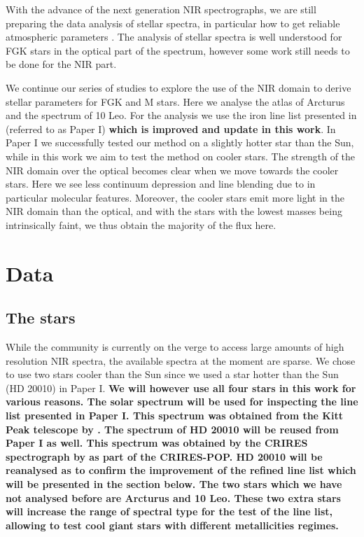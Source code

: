 \documentclass{aa}
\begin{document}
With the advance of the next generation NIR spectrographs, we are still
preparing the data analysis of stellar spectra, in particular how to get
reliable atmospheric parameters \citep[see e.g.][]{Onehag2012,Lindgren2016,Andreasen2016}.
The analysis of stellar spectra is well understood for FGK stars in the optical
part of the spectrum, however some work still needs to be done for the NIR part.

We continue our series of studies to explore the use of the NIR domain to derive
stellar parameters for FGK and M stars. Here we analyse the atlas of Arcturus
and the spectrum of 10 Leo. For the analysis we use the iron line list presented
in \citet{Andreasen2016} (referred to as Paper I) {\bf which is improved and
update in this work}. In Paper I we successfully tested our method on a slightly
hotter star than the Sun, while in this work we aim to test the method on cooler
stars. The strength of the NIR domain over the optical becomes clear when we
move towards the cooler stars. Here we see less continuum depression and line
blending due to in particular molecular features. Moreover, the cooler stars
emit more light in the NIR domain than the optical, and with the stars with the
lowest masses being intrinsically faint, we thus obtain the majority of the flux
here.



\section{Data}
\label{sec:data}

\subsection{The stars}

While the community is currently on the verge to access large amounts of high
resolution NIR spectra, the available spectra at the moment are sparse. We chose
to use two stars cooler than the Sun since we used a star hotter than the Sun
(HD 20010) in Paper I. {\bf We will however use all four stars in this work for
various reasons. The solar spectrum will be used for inspecting the line list
presented in Paper I. This spectrum was obtained from the Kitt Peak telescope by
\citet{Hinkle1995}. The spectrum of HD 20010 will be reused from Paper I as
well. This spectrum was obtained by the CRIRES spectrograph by
\citet{Lebzelter2012} as part of the CRIRES-POP. HD 20010 will be reanalysed as
to confirm the improvement of the refined line list which will be presented in
the section below. The two stars which we have not analysed before are Arcturus
and 10 Leo. These two extra stars will increase the range of spectral type for
the test of the line list, allowing to test cool giant stars with different
metallicities regimes.}
\end{document}
